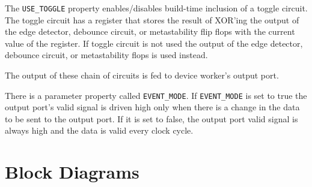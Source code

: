 \documentclass{article}
\begin{document}
\begin{flushleft}
The \texttt{USE\_TOGGLE} property enables/disables build-time inclusion of a toggle circuit. The toggle circuit has a register that stores the result of XOR'ing the output of the edge detector, debounce circuit, or metastability flip flops with the current value of the register. If toggle circuit is not used the output of the edge detector, debounce circuit, or metastability flops is used instead.   \newline

The output of these chain of circuits is fed to device worker's output port. \newline

There is a parameter property called \texttt{EVENT\_MODE}. If \texttt{EVENT\_MODE} is set to true the output port's valid signal is driven high only when there is a change in the data to be sent to the output port. If it is set to false, the output port valid signal is always high and the data is valid every clock cycle. 

\end{flushleft}


\section*{Block Diagrams}
\end{document}
